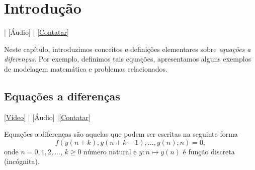
\chapter{Introdução}\label{cap_intro}

\begin{flushright}
  [Vídeo] | [Áudio] | \href{https://phkonzen.github.io/notas/contato.html}{[Contatar]}
\end{flushright}

Neste capítulo, introduzimos conceitos e definições elementares sobre \emph{equações a diferenças}. Por exemplo, definimos tais equações, apresentamos alguns exemplos de modelagem matemática e problemas relacionados.

\section{Equações a diferenças}\label{cap_intro_sec_ead}

\begin{flushleft}
  \href{https://archive.org/details/ead-intro}{[Vídeo]} | [Áudio] |\href{https://phkonzen.github.io/notas/contato.html}{[Contatar]}
\end{flushleft}

Equações a diferenças são aquelas que podem ser escritas na seguinte forma
\begin{equation}\label{eq:intro_ead}
  f\left(y(n+k),y(n+k-1),\dotsc,y(n);n\right) = 0,
\end{equation}
onde $n=0, 1, 2, \ldots$, $k\geq 0$ número natural e $y:n\mapsto y(n)$ é função discreta (incógnita).

